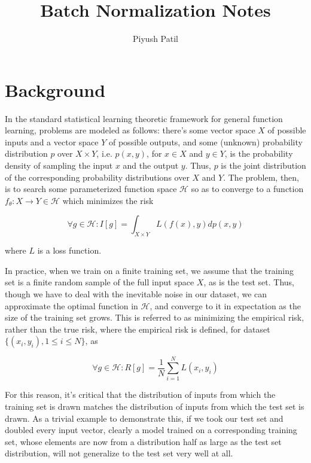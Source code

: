 \documentclass{article}
\begin{document}
\title{Batch Normalization Notes}
\author{Piyush Patil}
\maketitle

\section{Background}
In the standard statistical learning theoretic framework for general function learning, problems are modeled as follows: there's some vector space $ X $ of possible inputs and a vector space $ Y $ of possible outputs, and some (unknown) probability distribution $ p $ over $ X \times Y $, i.e. $ p(x, y) $, for $ x \in X $ and $ y \in Y $, is the probability density of sampling the input $ x $ and the output $ y $. Thus, $ p $ is the joint distribution of the corresponding probability distributions over $ X $ and $ Y $. The problem, then, is to search some parameterized function space $ \mathcal{H} $ so as to converge to a function $ f_\theta: X \rightarrow Y \in \mathcal{H} $ which minimizes the risk

    $$ \forall g \in \mathcal{H}: I[g] = \int_{X \times Y} L(f(x), y) d p(x, y) $$

where $ L $ is a loss function.

In practice, when we train on a finite training set, we assume that the training set is a finite random sample of the full input space $ X $, as is the test set. Thus, though we have to deal with the inevitable noise in our dataset, we can approximate the optimal function in $ \mathcal{H} $, and converge to it in expectation as the size of the training set grows. This is referred to as minimizing the empirical risk, rather than the true risk, where the empirical risk is defined, for dataset $ \{ (x_i, y_i), 1 \leq i \leq N \} $, as 

    $$ \forall g \in \mathcal{H}: R[g] = \frac{1}{N} \sum_{i = 1}^N L(x_i, y_i) $$

For this reason, it's critical that the distribution of inputs from which the training set is drawn matches the distribution of inputs from which the test set is drawn. As a trivial example to demonstrate this, if we took our test set and doubled every input vector, clearly a model trained on a corresponding training set, whose elements are now from a distribution half as large as the test set distribution, will not generalize to the test set very well at all.
\end{document}
